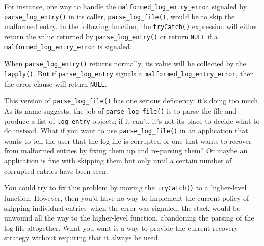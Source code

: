 For instance, one way to handle the
\texttt{malformed\_log\_entry\_error} signaled by
\texttt{parse\_log\_entry()} in its caller, \texttt{parse\_log\_file()},
would be to skip the malformed entry. In the following function, the
\texttt{tryCatch()} expression will either return the value returned by
\texttt{parse\_log\_entry()} or return \texttt{NULL} if a
\texttt{malformed\_log\_entry\_error} is signaled.

\begin{Shaded}
\begin{Highlighting}[]
\StringTok{ }
  \StringTok{ }
  
    \NormalTok{(}
       \NormalTok{,}
    \NormalTok{)}
  \NormalTok{\})}
\NormalTok{\}}
\end{Highlighting}
\end{Shaded}

When \texttt{parse\_log\_entry()} returns normally, its value will be
collected by the \texttt{lapply()}. But if \texttt{parse\_log\_entry}
signals a \texttt{malformed\_log\_entry\_error}, then the error clause
will return \texttt{NULL}.

This version of \texttt{parse\_log\_file()} has one serious deficiency:
it's doing too much. As its name suggests, the job of
\texttt{parse\_log\_file()} is to parse the file and produce a list of
\texttt{log\_entry} objects; if it can't, it's not its place to decide
what to do instead. What if you want to use \texttt{parse\_log\_file()}
in an application that wants to tell the user that the log file is
corrupted or one that wants to recover from malformed entries by fixing
them up and re-parsing them? Or maybe an application is fine with
skipping them but only until a certain number of corrupted entries have
been seen.

You could try to fix this problem by moving the \texttt{tryCatch()} to a
higher-level function. However, then you'd have no way to implement the
current policy of skipping individual entries--when the error was
signaled, the stack would be unwound all the way to the higher-level
function, abandoning the parsing of the log file altogether. What you
want is a way to provide the current recovery strategy without requiring
that it always be used.

